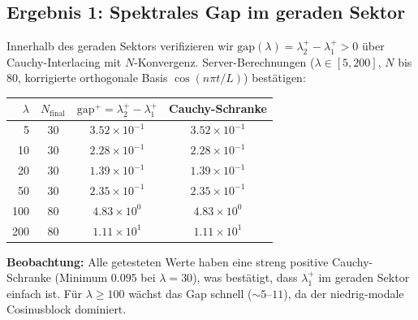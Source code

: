 ﻿\documentclass[12pt,a4paper]{article}
\theoremstyle{definition}
\theoremstyle{remark}
\begin{document}
\subsection{Ergebnis 1: Spektrales Gap im geraden Sektor}

Innerhalb des geraden Sektors verifizieren wir $\mathrm{gap}(\lambda) = \lambda_2^+ - \lambda_1^+ > 0$ über Cauchy-Interlacing mit $N$-Konvergenz. Server-Berechnungen ($\lambda \in [5,200]$, $N$ bis 80, korrigierte orthogonale Basis $\cos(n\pi t/L)$) bestätigen:

\medskip
\begin{center}
\renewcommand{\arraystretch}{1.2}
\begin{tabular}{r|c|c|c}
$\lambda$ & $N_{\mathrm{final}}$ & $\mathrm{gap}^+ = \lambda_2^+ - \lambda_1^+$ & Cauchy-Schranke \\\hline
5 & 30 & $3.52\times 10^{-1}$ & $3.52\times 10^{-1}$ \\
10 & 30 & $2.28\times 10^{-1}$ & $2.28\times 10^{-1}$ \\
20 & 30 & $1.39\times 10^{-1}$ & $1.39\times 10^{-1}$ \\
50 & 30 & $2.35\times 10^{-1}$ & $2.35\times 10^{-1}$ \\
100 & 80 & $4.83\times 10^{0}$ & $4.83\times 10^{0}$ \\
200 & 80 & $1.11\times 10^{1}$ & $1.11\times 10^{1}$ \\
\end{tabular}
\end{center}

\medskip\noindent
\textbf{Beobachtung:} Alle getesteten Werte haben eine streng positive Cauchy-Schranke (Minimum $0.095$ bei $\lambda=30$), was bestätigt, dass $\lambda_1^+$ im geraden Sektor einfach ist. Für $\lambda \geq 100$ wächst das Gap schnell ($\sim 5$--$11$), da der niedrig-modale Cosinusblock dominiert.
\end{document}
